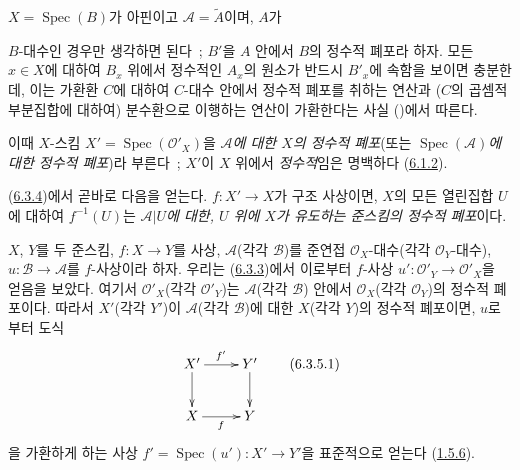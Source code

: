 $X=\operatorname{Spec}(B)$가 아핀이고 $\mathcal{A}=\widetilde{A}$이며,
$A$가


$B$-대수인 경우만 생각하면 된다~; $B'$을 $A$ 안에서 $B$의 정수적
폐포라 하자. 모든 $x\in X$에 대하여 $B_x$ 위에서 정수적인 $A_x$의
원소가 반드시 $B'_x$에 속함을 보이면 충분한데, 이는 가환환 $C$에
대하여 $C$-대수 안에서 정수적 폐포를 취하는 연산과 ($C$의 곱셈적
부분집합에 대하여) 분수환으로 이행하는 연산이 가환한다는 사실
(\cite[t.~I, p.~261 et 257]{I-13})에서 따른다.

이때 $X$-스킴 $X'=\operatorname{Spec}(\mathcal{O}'_X)$을
\emph{$\mathcal{A}$에 대한 $X$의 정수적 폐포}(또는
\emph{$\operatorname{Spec}(\mathcal{A})$에 대한 정수적 폐포})라 부른다~;
$X'$이 $X$ 위에서 \emph{정수적}임은 명백하다
(\hyperref[II.6.1.2-ko]{6.1.2}).

(\hyperref[II.6.3.4-ko]{6.3.4})에서 곧바로 다음을 얻는다. $f:X'\to X$가
구조 사상이면, $X$의 모든 열린집합 $U$에 대하여 $f^{-1}(U)$는
\emph{$\mathcal{A}|U$에 대한, $U$ 위에 $X$가 유도하는 준스킴의 정수적
폐포}이다.

\begin{env}[6.3.5]
\label{II.6.3.5-ko}
$X$, $Y$를 두 준스킴, $f:X\to Y$를 사상, $\mathcal{A}$(각각
$\mathcal{B}$)를 준연접 $\mathcal{O}_X$-대수(각각
$\mathcal{O}_Y$-대수), $u:\mathcal{B}\to\mathcal{A}$를 $f$-사상이라
하자. 우리는 (\hyperref[II.6.3.3-ko]{6.3.3})에서 이로부터
$f$-사상 $u':\mathcal{O}'_Y\to\mathcal{O}'_X$을 얻음을 보았다. 여기서
$\mathcal{O}'_X$(각각 $\mathcal{O}'_Y$)는 $\mathcal{A}$(각각
$\mathcal{B}$) 안에서 $\mathcal{O}_X$(각각 $\mathcal{O}_Y$)의 정수적
폐포이다. 따라서 $X'$(각각 $Y'$)이 $\mathcal{A}$(각각
$\mathcal{B}$)에 대한 $X$(각각 $Y$)의 정수적 폐포이면, $u$로부터
도식
\[
\label{II.6.3.5.1-ko}
\xymatrix{
X'\ar[r]^{f'}\ar[d]&Y'\ar[d]\\
X\ar[r]_{f}&Y
}
\tag{6.3.5.1}
\]
을 가환하게 하는 사상 $f'=\operatorname{Spec}(u'):X'\to Y'$을 표준적으로
얻는다 (\hyperref[II.1.5.6-ko]{1.5.6}).
\end{env}


